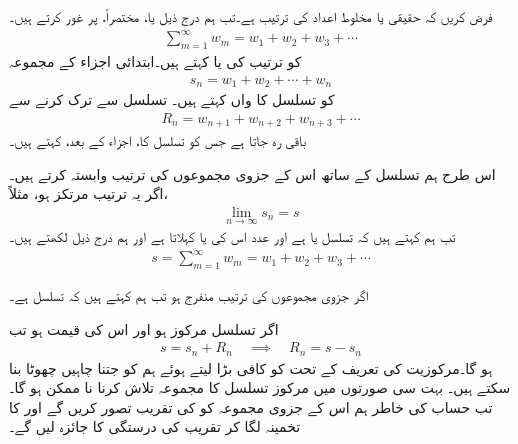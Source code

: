 فرض کریں کہ  حقیقی یا مخلوط اعداد کی ترتیب ہے۔تب ہم درج ذیل  یا، مختصراً،  پر غور کرتے ہیں۔
\begin{align}\label{مساوات_ترتیب_تسلسل_الف}
\sum_{m=1}^{\infty} w_m=w_1+w_2+w_3+\cdots
\end{align}
 کو ترتیب کی  یا   کہتے ہیں۔ابتدائی  اجزاء کے مجموعہ
\begin{align}\label{مساوات_ترتیب_تسلسل_ب}
s_n=w_1+w_2+\cdots+w_n
\end{align}
کو تسلسل  کا  واں  کہتے ہیں۔ تسلسل  سے   ترک کرنے سے
\begin{align}
R_n=w_{n+1}+w_{n+2}+w_{n+3}+\cdots
\end{align}
باقی رہ جاتا ہے جس کو تسلسل  کا،  اجزاء کے بعد،  کہتے ہیں۔ 

اس طرح ہم تسلسل  کے ساتھ اس کے جزوی مجموعوں  کی ترتیب وابستہ کرتے ہیں۔اگر یہ ترتیب مرتکز ہو، مثلاً،
\begin{align*}
\lim_{n\to \infty} s_n=s
\end{align*}
تب ہم کہتے ہیں کہ تسلسل   یا  ہے اور عدد  اس کی  یا  کہلاتا ہے اور ہم درج ذیل لکھتے ہیں۔
\begin{align*}
s=\sum_{m=1}^{\infty} w_m=w_1+w_2+w_3+\cdots
\end{align*}

اگر جزوی مجموعوں کی ترتیب منفرج ہو تب ہم کہتے ہیں کہ تسلسل     ہے۔

اگر تسلسل  مرکوز ہو اور اس کی قیمت  ہو تب
\begin{align}
s=s_n+R_n\quad \implies \quad R_n=s-s_n
\end{align}
ہو گا۔مرکوزیت کی تعریف کے تحت  کو کافی بڑا لیتے ہوئے  ہم  کو جتنا چاہیں چھوٹا بنا سکتے ہیں۔ بہت سی صورتوں میں مرکوز تسلسل کا مجموعہ  تلاش کرنا نا ممکن ہو گا۔تب حساب کی خاطر ہم اس کے جزوی مجموعہ  کو  کی تقریب تصور کریں گے اور  کا تخمینہ لگا کر  تقریب کی درستگی کا جائزہ لیں گے۔

